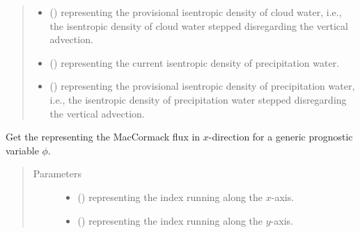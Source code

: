 \documentclass[letterpaper,10pt,english]{sphinxmanual}
\begin{document}
\begin{fulllineitems}
\begin{fulllineitems}
\begin{quote}
\begin{description}
\begin{itemize}
\item {} 
 () \textendash{}  representing the provisional isentropic density of cloud water,
i.e., the isentropic density of cloud water stepped disregarding the vertical advection.

\item {} 
 () \textendash{}  representing the current isentropic density of precipitation water.

\item {} 
 () \textendash{}  representing the provisional isentropic density of precipitation water,
i.e., the isentropic density of precipitation water stepped disregarding the vertical advection.

\end{itemize}

\end{description}\end{quote}

\end{fulllineitems}


\begin{fulllineitems}
\label{\detokenize{api:dycore.flux_isentropic_maccormack.FluxIsentropicMacCormack._get_maccormack_flux_x}}
Get the  representing the MacCormack flux in \(x\)-direction
for a generic prognostic variable \(\phi\).
\begin{quote}\begin{description}
\item[{Parameters}] \leavevmode\begin{itemize}
\item {} 
 () \textendash{}  representing the index running along the \(x\)-axis.

\item {} 
 () \textendash{}  representing the index running along the \(y\)-axis.


\end{itemize}
\end{description}
\end{quote}
\end{fulllineitems}
\end{fulllineitems}
\end{document}
